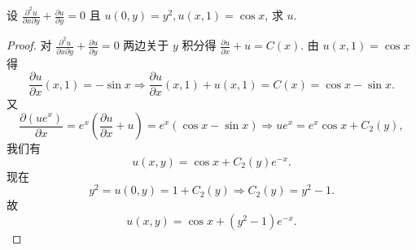\documentclass[../../main.tex]{subfiles}
\begin{document}
\begin{example}
设 \( \frac{\partial^2 u}{\partial x \partial y} + \frac{\partial u}{\partial y} = 0 \) 且 \( u(0, y) = y^2, u(x, 1) = \cos x \), 求 \( u \).
\end{example}
\begin{proof}
对 \( \frac{\partial^2 u}{\partial x \partial y} + \frac{\partial u}{\partial y} = 0 \) 两边关于 \( y \) 积分得 \( \frac{\partial u}{\partial x} + u = C(x) \). 由 \( u(x, 1) = \cos x \) 得
\[
\frac{\partial u}{\partial x}(x,1)=-\sin x\Rightarrow \frac{\partial u}{\partial x}\left( x,1 \right) +u\left( x,1 \right) =C(x)=\cos x-\sin x.
\]
又
\[
\frac{\partial (u e^x)}{\partial x} = e^x \left( \frac{\partial u}{\partial x} + u \right) = e^x (\cos x - \sin x) \Rightarrow u e^x = e^x \cos x + C_2(y),
\]
我们有
\[
u(x, y) = \cos x + C_2(y) e^{-x}.
\]
现在
\[
y^2 = u(0, y) = 1 + C_2(y) \Rightarrow C_2(y) = y^2 - 1.
\]
故
\[
u(x, y) = \cos x + (y^2 - 1) e^{-x}.
\]
\end{proof}
\end{document}
